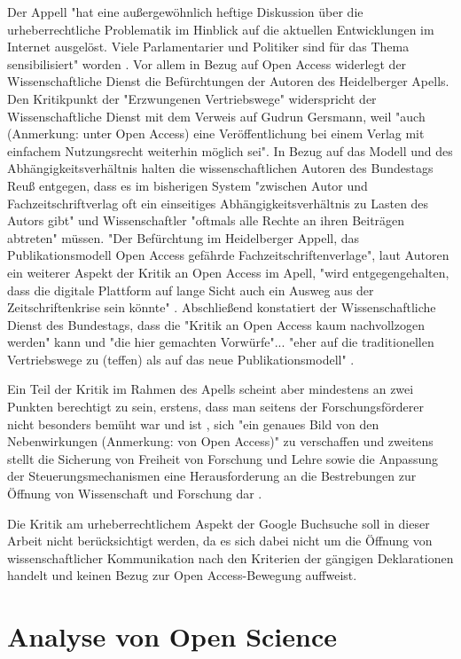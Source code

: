 Der Appell "hat eine außergewöhnlich heftige Diskussion über die urheberrechtliche Problematik im Hinblick auf die aktuellen Entwicklungen im Internet ausgelöst. Viele Parlamentarier und Politiker sind für das Thema sensibilisiert" worden \cite{WD_bundestag_2009}. Vor allem in Bezug auf Open Access widerlegt der Wissenschaftliche Dienst die Befürchtungen der Autoren des Heidelberger Apells. Den Kritikpunkt der "Erzwungenen Vertriebswege" widerspricht der Wissenschaftliche Dienst mit dem Verweis auf Gudrun Gersmann, weil "auch (Anmerkung: unter Open Access) eine Veröffentlichung bei einem Verlag mit einfachem Nutzungsrecht weiterhin möglich sei". In Bezug auf das Modell und des Abhängigkeitsverhältnis halten die wissenschaftlichen Autoren des Bundestags Reuß entgegen, dass es im bisherigen System "zwischen Autor und Fachzeitschriftverlag oft ein einseitiges Abhängigkeitsverhältnis zu Lasten des Autors gibt" und Wissenschaftler "oftmals alle Rechte an ihren Beiträgen abtreten" \cite{WD_bundestag_2009} müssen. "Der Befürchtung im Heidelberger Appell, das Publikationsmodell Open Access gefährde Fachzeitschriftenverlage", laut Autoren ein weiterer Aspekt der Kritik an Open Access im Apell, "wird entgegengehalten, dass die digitale Plattform auf lange Sicht auch ein Ausweg aus der Zeitschriftenkrise sein könnte" \cite{WD_bundestag_2009}. Abschließend konstatiert der Wissenschaftliche Dienst des Bundestags, dass die "Kritik an Open Access kaum nachvollzogen werden" kann und "die hier gemachten Vorwürfe"... "eher auf die traditionellen Vertriebswege zu (teffen) als auf das neue Publikationsmodell" \cite{WD_bundestag_2009}.

Ein Teil der Kritik im Rahmen des Apells scheint aber mindestens an zwei Punkten berechtigt zu sein, erstens, dass man seitens der Forschungsförderer nicht besonders bemüht war und ist \cite{suchen}, sich "ein genaues Bild von den Nebenwirkungen (Anmerkung: von Open Access)" \cite{Reuss_2009} zu verschaffen und zweitens stellt die Sicherung von Freiheit von Forschung und Lehre sowie die Anpassung der Steuerungsmechanismen eine Herausforderung an die Bestrebungen zur Öffnung von Wissenschaft und Forschung dar \cite{suchen}.

Die Kritik am urheberrechtlichem Aspekt der Google Buchsuche soll in dieser Arbeit nicht berücksichtigt werden, da es sich dabei nicht um die Öffnung von wissenschaftlicher Kommunikation nach den Kriterien der gängigen Deklarationen handelt und keinen Bezug zur Open Access-Bewegung auffweist.


\section{Analyse von Open Science}


